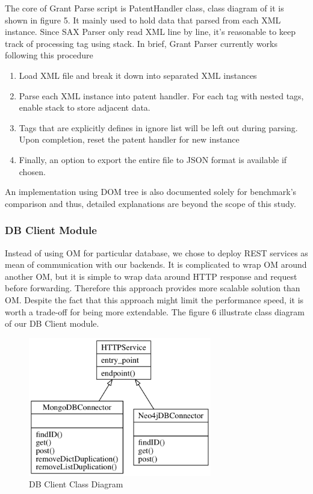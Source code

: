 \documentclass{sig-alternate}
\begin{document}
{The core of Grant Parse script is PatentHandler class, class diagram of it is shown in figure 5. It mainly used to hold data that parsed from each XML instance. Since SAX Parser only read XML line by line, it's reasonable to keep track of processing tag using stack. In brief, Grant Parser currently works following this procedure
\begin{enumerate}
 \item Load XML file and break it down into separated XML instances
 \item Parse each XML instance into patent handler. For each tag with nested tags, enable stack to store adjacent data.
 \item Tags that are explicitly defines in ignore list will be left out during parsing. Upon completion, reset the patent handler for new instance
 \item Finally, an option to export the entire file to JSON format is available if chosen.
\end{enumerate}

An implementation using DOM tree is also documented solely for benchmark's comparison and thus, detailed explanations are beyond the scope of this study.

\subsubsection{DB Client Module}
Instead of using OM for particular database, we chose to deploy REST services as mean of communication with our backends. It is complicated to wrap OM around another OM, but it is simple to wrap data around HTTP response and request before forwarding. Therefore this approach provides more scalable solution than OM. Despite the fact that this approach might limit the performance speed, it is worth a trade-off for being more extendable. The figure 6 illustrate class diagram of our DB Client module.

\begin{figure}[htb]
\centering
\includegraphics[width=80mm,scale=10]{db_client.png}
\caption{ DB Client Class Diagram}
\end{figure}

}
\end{document}
